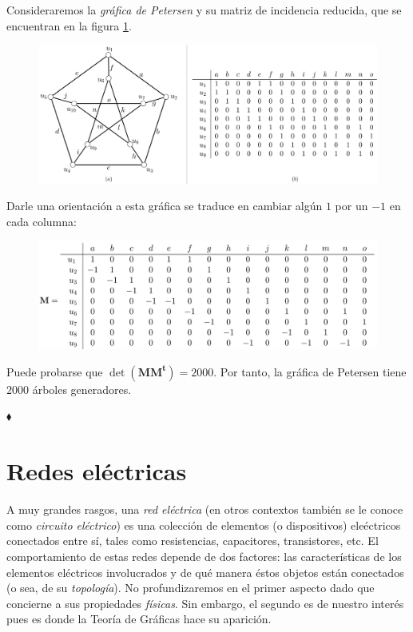 \begin{ejem}
Consideraremos la \textit{gráfica de Petersen} y su matriz de incidencia reducida, que se encuentran en la figura \ref{fig:petersen}.

\begin{figure}[H]
    \centering
    \includegraphics[scale=0.14]{img/imgchapter4/petersen.jpg}
    \caption{}
    \label{fig:petersen}
\end{figure}

Darle una orientación a esta gráfica se traduce en cambiar algún $1$ por un $-1$ en cada columna:

\begin{figure}[H]
    \centering
    \includegraphics[scale=0.16]{img/imgchapter4/petersendirigido.jpg}
    \caption{}
    \label{fig:petersendirigido}
\end{figure}

Puede probarse que $\det(\mathbf{M}\mathbf{M^{t}}) = 2000$. Por tanto, la gráfica de Petersen tiene $2000$ árboles generadores.      

\hfill $\blacklozenge$
\end{ejem}


\section{Redes eléctricas}
A muy grandes rasgos, una \textit{red eléctrica} (en otros contextos también se le conoce como \textit{circuito eléctrico}) es una colección de elementos (o dispositivos) eleéctricos conectados entre sí, tales como resistencias, capacitores, transistores, etc. El comportamiento de estas redes depende de dos factores: las características de los elementos eléctricos involucrados y de qué manera éstos objetos están conectados (o sea, de su \textit{topología}). No profundizaremos en el primer aspecto dado que concierne a sus propiedades \textit{físicas}. Sin embargo, el segundo es de nuestro interés pues es donde la Teoría de Gráficas hace su aparición.

